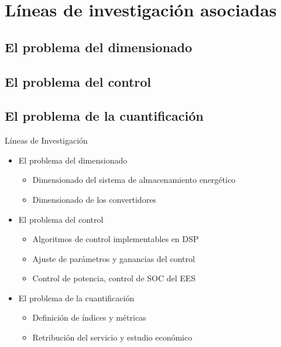 \section[Líneas de investigación asociadas]{Líneas de investigación asociadas}
%
%
\subsection[]{El problema del dimensionado}
\subsection[]{El problema del control}
\subsection[]{El problema de la cuantificación}
%
%
%
%
\begin{frame}{Líneas de Investigación}
\begin{itemize}
    \item El problema del dimensionado
    \begin{itemize}
        \item Dimensionado del sistema de almacenamiento energético \\[1ex]
        \item Dimensionado de los convertidores \\[2ex]
    \end{itemize}
    \item El problema del control
    \begin{itemize}
        \item Algoritmos de control implementables en DSP \\[1ex]
        \item Ajuste de parámetros y ganancias del control \\[1ex]
        \item Control de potencia, control de SOC del EES \\[2ex]
    \end{itemize}{}
    \item El problema de la cuantificación
    \begin{itemize}
        \item Definición de índices y métricas \\[1ex]
        \item Retribución del servicio y estudio económico \\[1ex]
    \end{itemize}
\end{itemize}
\end{frame}
%
%